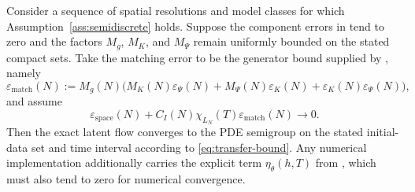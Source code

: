 \begin{corollary}\label{cor:resolve-prob1}
Consider a sequence of spatial resolutions and model classes for which Assumption~\ref{ass:semidiscrete} holds. Suppose the component errors in  tend to zero and the factors $M_g$, $M_K$, and $M_\Psi$ remain uniformly bounded on the stated compact sets.  Take the matching error to be the generator bound supplied by , namely
\begin{equation*}
\varepsilon_{\mathrm{match}}(N):=M_g(N)\bigl(M_K(N)\varepsilon_\Psi(N)+M_\Psi(N)\varepsilon_K(N)+\varepsilon_K(N)\varepsilon_\Psi(N)\bigr),
\end{equation*}
and assume
\begin{equation*}
\varepsilon_{\mathrm{space}}(N)+C_I(N)\chi_{L_N}(T)\varepsilon_{\mathrm{match}}(N)\longrightarrow0.
\end{equation*}
Then the exact latent flow converges to the PDE semigroup on the stated initial-data set and time interval according to \eqref{eq:transfer-bound}. Any numerical implementation additionally carries the explicit term $\eta_\theta(h,T)$ from , which must also tend to zero for numerical convergence.
\end{corollary}

